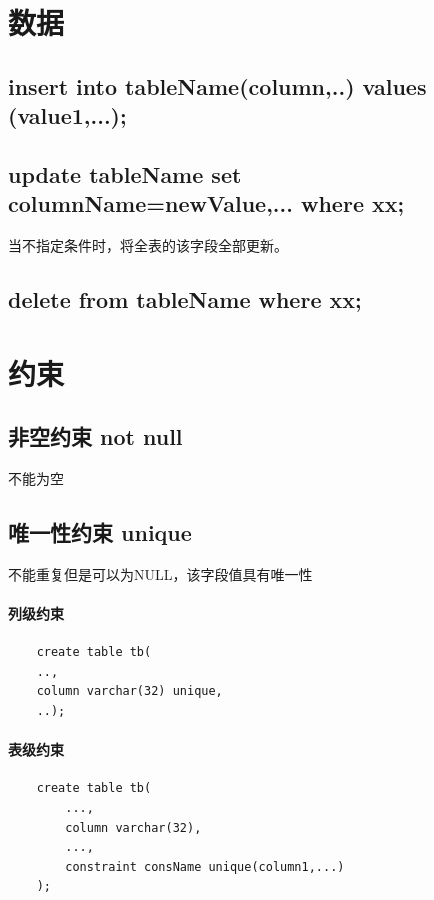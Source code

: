 \documentclass[UTF8,a4paper,12pt]{ctexbook}
\begin{document}
	\section{数据}
		\subsection{insert into tableName(column,..) values (value1,...);}
		
		\subsection{update tableName set columnName=newValue,... where xx;}
			当不指定条件时，将全表的该字段全部更新。
		
		\subsection{delete from tableName where xx;}
	
	
		
	\section{约束}
		\subsection{非空约束 not null}
			不能为空
			
		\subsection{唯一性约束 unique}
			不能重复但是可以为NULL，该字段值具有唯一性
			
			\paragraph{列级约束}
				\begin{lstlisting}
	create table tb(
	..,
	column varchar(32) unique,
	..);
				\end{lstlisting}
				
			\paragraph{表级约束}
				\begin{lstlisting}
	create table tb(
		...,
		column varchar(32),
		...,
		constraint consName unique(column1,...)
	);
				\end{lstlisting}
			
\end{document}
